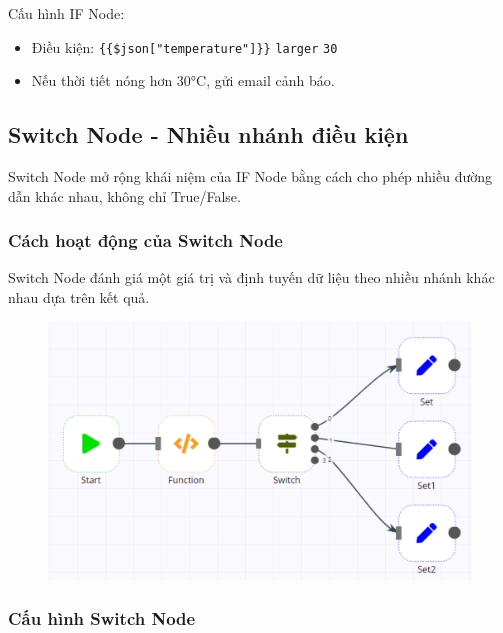 Cấu hình IF Node:

\begin{itemize}
  \item Điều kiện: \texttt{\{\{\$json["temperature"]\}\}} \texttt{larger} \texttt{30}
  \item Nếu thời tiết nóng hơn 30°C, gửi email cảnh báo.
\end{itemize}

\newpage

\subsection{Switch Node - Nhiều nhánh điều kiện}

Switch Node mở rộng khái niệm của IF Node bằng cách cho phép nhiều đường dẫn khác nhau, không chỉ True/False.
\subsubsection{Cách hoạt động của Switch Node}

Switch Node đánh giá một giá trị và định tuyến dữ liệu theo nhiều nhánh khác nhau dựa trên kết quả.

\begin{figure}[htbp]
    \centering
    \includegraphics[width=1\linewidth]{Chap1-7/switch_node.pdf}
\end{figure}

\subsubsection{Cấu hình Switch Node}

